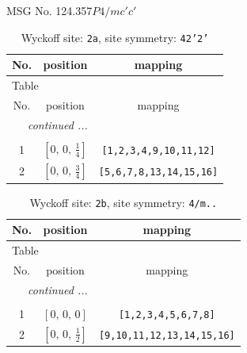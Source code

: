 \documentclass[fleqn,8pt]{jsarticle}
\begin{document}
\setcounter{MaxMatrixCols}{32}

\renewcommand{\tablename}{Table~}
\renewcommand{\figurename}{Figure~}
\begin{center}
\LARGE
MSG No. 124.357\quad$P4/mc'c'$
\end{center}
\renewcommand{\arraystretch}{1.2}
\begin{longtable}{ccc}
\caption{Wyckoff site: {\tt 2a}, site symmetry: {\tt 42'2'}}
 \\
 \hline \hline
No. & position & mapping \\ \hline \endfirsthead

\multicolumn{2}{l}{\tablename\ \thetable{}} \\
 \hline \hline
No. & position & mapping \\ \hline \endhead

 \hline \hline
\multicolumn{2}{r}{\footnotesize\it continued ...} \\ \endfoot

 \hline \hline
\multicolumn{2}{r}{} \\ \endlastfoot

1 & $\left[ 0,\, 0,\, \frac{1}{4} \right]$ & {\tt [1,2,3,4,9,10,11,12]} \\ \hline
2 & $\left[ 0,\, 0,\, \frac{3}{4} \right]$ & {\tt [5,6,7,8,13,14,15,16]} \\
\end{longtable}
\renewcommand{\arraystretch}{1.2}
\begin{longtable}{ccc}
\caption{Wyckoff site: {\tt 2b}, site symmetry: {\tt 4/m..}}
 \\
 \hline \hline
No. & position & mapping \\ \hline \endfirsthead

\multicolumn{2}{l}{\tablename\ \thetable{}} \\
 \hline \hline
No. & position & mapping \\ \hline \endhead

 \hline \hline
\multicolumn{2}{r}{\footnotesize\it continued ...} \\ \endfoot

 \hline \hline
\multicolumn{2}{r}{} \\ \endlastfoot

1 & $\left[ 0,\, 0,\, 0 \right]$ & {\tt [1,2,3,4,5,6,7,8]} \\ \hline
2 & $\left[ 0,\, 0,\, \frac{1}{2} \right]$ & {\tt [9,10,11,12,13,14,15,16]} \\
\end{longtable}
\end{document}
